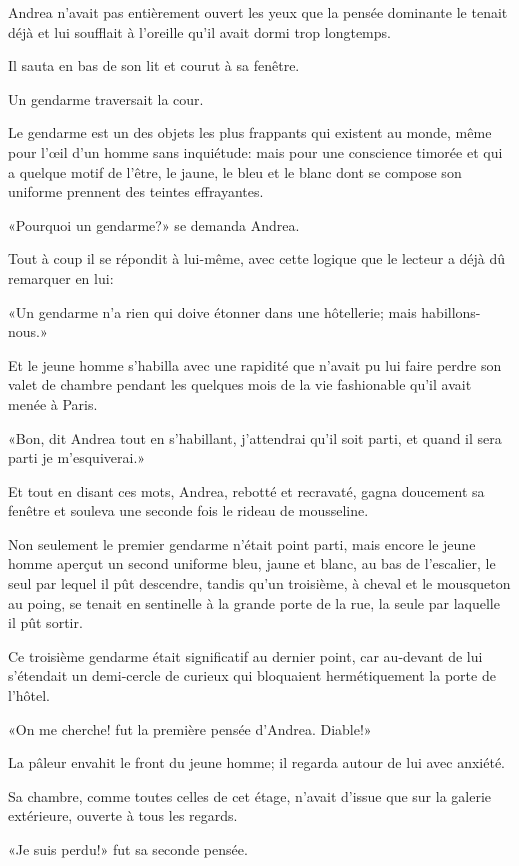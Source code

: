 Andrea n'avait pas entièrement ouvert les yeux que la pensée dominante le tenait déjà et lui soufflait à l'oreille qu'il avait dormi trop longtemps. 

Il sauta en bas de son lit et courut à sa fenêtre. 

Un gendarme traversait la cour. 

Le gendarme est un des objets les plus frappants qui existent au monde, même pour l'œil d'un homme sans inquiétude: mais pour une conscience timorée et qui a quelque motif de l'être, le jaune, le bleu et le blanc dont se compose son uniforme prennent des teintes effrayantes. 

«Pourquoi un gendarme?» se demanda Andrea. 

Tout à coup il se répondit à lui-même, avec cette logique que le lecteur a déjà dû remarquer en lui: 

«Un gendarme n'a rien qui doive étonner dans une hôtellerie; mais habillons-nous.» 

Et le jeune homme s'habilla avec une rapidité que n'avait pu lui faire perdre son valet de chambre pendant les quelques mois de la vie fashionable qu'il avait menée à Paris. 

«Bon, dit Andrea tout en s'habillant, j'attendrai qu'il soit parti, et quand il sera parti je m'esquiverai.» 

Et tout en disant ces mots, Andrea, rebotté et recravaté, gagna doucement sa fenêtre et souleva une seconde fois le rideau de mousseline. 

Non seulement le premier gendarme n'était point parti, mais encore le jeune homme aperçut un second uniforme bleu, jaune et blanc, au bas de l'escalier, le seul par lequel il pût descendre, tandis qu'un troisième, à cheval et le mousqueton au poing, se tenait en sentinelle à la grande porte de la rue, la seule par laquelle il pût sortir. 

Ce troisième gendarme était significatif au dernier point, car au-devant de lui s'étendait un demi-cercle de curieux qui bloquaient hermétiquement la porte de l'hôtel. 

«On me cherche! fut la première pensée d'Andrea. Diable!» 

La pâleur envahit le front du jeune homme; il regarda autour de lui avec anxiété. 

Sa chambre, comme toutes celles de cet étage, n'avait d'issue que sur la galerie extérieure, ouverte à tous les regards. 

«Je suis perdu!» fut sa seconde pensée. 

